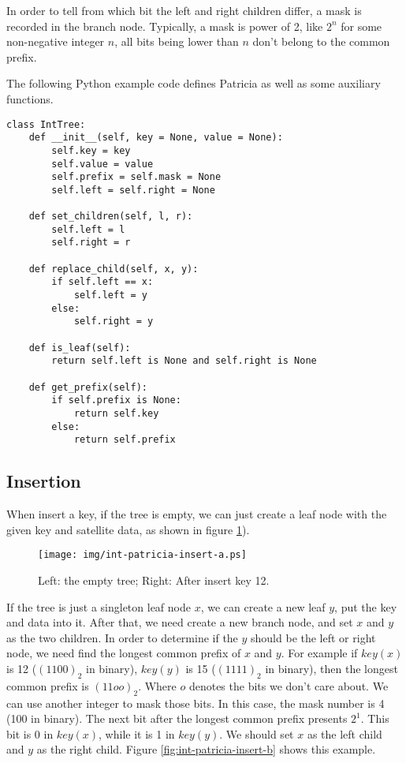 \documentclass{article}
\begin{document}
In order to tell from which bit the left and right children differ, a
mask is recorded in the branch node. Typically, a mask is power of 2,
like $2^n$ for some non-negative integer $n$, all
bits being lower than $n$ don't belong to the common prefix.

The following Python example code defines Patricia as well as
some auxiliary functions.

\lstset{language=Python}
\begin{lstlisting}
class IntTree:
    def __init__(self, key = None, value = None):
        self.key = key
        self.value = value
        self.prefix = self.mask = None
        self.left = self.right = None

    def set_children(self, l, r):
        self.left = l
        self.right = r

    def replace_child(self, x, y):
        if self.left == x:
            self.left = y
        else:
            self.right = y

    def is_leaf(self):
        return self.left is None and self.right is None

    def get_prefix(self):
        if self.prefix is None:
            return self.key
        else:
            return self.prefix
\end{lstlisting}


\subsection{Insertion}
When insert a key, if the tree is empty,
we can just create a leaf node with the given key and satellite data,
as shown in figure \ref{fig:int-patricia-insert-a}).

\begin{figure}[htbp]
  \centering
  \texttt{[image: img/int-patricia-insert-a.ps]}
  \caption{Left: the empty tree; Right: After insert key 12.}
  \label{fig:int-patricia-insert-a}
\end{figure}

If the tree is just a singleton leaf node $x$, we can create a new leaf $y$,
put the key and data into it. After that, we need create a new branch
node, and set $x$ and $y$ as the two children.
In order to determine if the $y$ should be the left or right node, we need
find the longest common prefix of $x$ and $y$. For example if $key(x)$
is 12 ($(1100)_2$ in binary), $key(y)$ is 15 ($(1111)_2$ in binary), then the longest
common prefix is $(11oo)_2$. Where $o$ denotes the bits we don't care about.
We can use another integer to mask those bits.
In this case, the mask number is 4 (100 in binary).
The next bit after the longest common prefix presents $2^1$. This bit is
0 in $key(x)$, while it is 1 in $key(y)$. We should set $x$ as the left
child and $y$ as the right child. Figure \ref{fig:int-patricia-insert-b}
shows this example.
\end{document}
